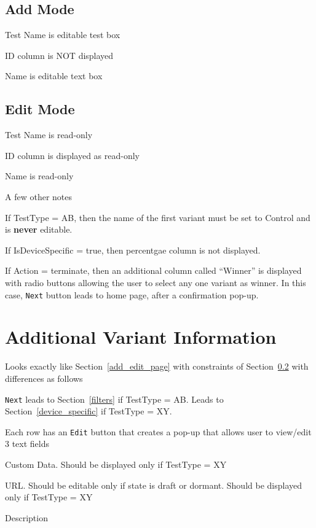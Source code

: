\documentclass[letterpaper]{article}
\begin{document}
 \subsection{Add Mode}
 \label{add_edit_page_add_mode}
 \bi
 \item Test Name is editable test box 
 \item ID column is NOT displayed
 \item Name is editable text box
\ei
 \subsection{Edit Mode}
 \label{add_edit_page_edit_mode}
 \bi
 \item Test Name is read-only
 \item ID column is displayed as read-only
 \item Name is read-only
   \ei

A few other notes
\bi
\item If TestType = AB, then the name of the first variant must be set to
  Control and is {\bf never} editable.
\item 
If IsDeviceSpecific = true, then percentgae column is not displayed.
\item If Action = terminate, then an additional column called ``Winner'' is
displayed with radio buttons allowing the user to select any one variant as
winner. In this case, {\tt Next} button leads to home page, after a confirmation
pop-up.
\ei

\section{Additional Variant Information}
\label{addnl_variant_info}
Looks exactly like Section~\ref{add_edit_page}
with constraints of Section~\ref{add_edit_page_edit_mode} with differences as follows
\be
\item {\tt Next} leads to Section~\ref{filters} if TestType = AB. 
Leads to Section~\ref{device_specific} if TestType = XY. 
\item Each row has
an {\tt Edit} button that creates a pop-up that allows user to view/edit 3 text
fields
\be
\item Custom Data.
  Should be displayed only if TestType = XY
\item URL. Should be editable only if state is draft or dormant. 
  Should be displayed only if TestType = XY
\item Description
\ee
\ee
\end{document}
